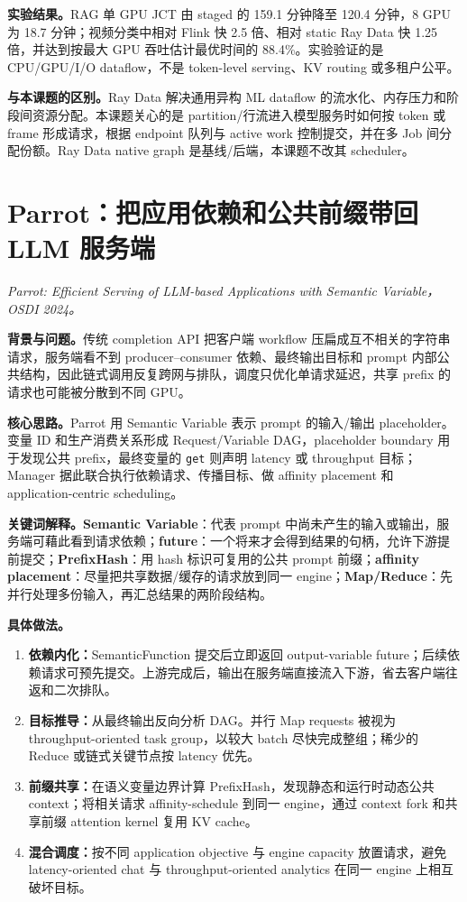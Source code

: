 \documentclass[10pt,a4paper]{ctexart}
\let\digestoriginalsection\section
\renewcommand{\section}{\Needspace{7\baselineskip}\digestoriginalsection}
\newcommand{\paperinfo}[1]{\textit{#1}\par}
\newcommand{\field}[1]{\par\noindent\textbf{#1。}\hspace{0.25em}}
\begin{document}
\field{实验结果}RAG 单 GPU JCT 由 staged 的 159.1 分钟降至 120.4 分钟，8 GPU 为 18.7 分钟；视频分类中相对 Flink 快 2.5 倍、相对 static Ray Data 快 1.25 倍，并达到按最大 GPU 吞吐估计最优时间的 88.4\%。实验验证的是 CPU/GPU/I/O dataflow，不是 token-level serving、KV routing 或多租户公平。

\field{与本课题的区别}Ray Data 解决通用异构 ML dataflow 的流水化、内存压力和阶段间资源分配。本课题关心的是 partition/行流进入模型服务时如何按 token 或 frame 形成请求，根据 endpoint 队列与 active work 控制提交，并在多 Job 间分配份额。Ray Data native graph 是基线/后端，本课题不改其 scheduler。

\section{Parrot：把应用依赖和公共前缀带回 LLM 服务端}
\paperinfo{Parrot: Efficient Serving of LLM-based Applications with Semantic Variable，OSDI 2024。}

\field{背景与问题}传统 completion API 把客户端 workflow 压扁成互不相关的字符串请求，服务端看不到 producer--consumer 依赖、最终输出目标和 prompt 内部公共结构，因此链式调用反复跨网与排队，调度只优化单请求延迟，共享 prefix 的请求也可能被分散到不同 GPU。

\field{核心思路}Parrot 用 Semantic Variable 表示 prompt 的输入/输出 placeholder。变量 ID 和生产消费关系形成 Request/Variable DAG，placeholder boundary 用于发现公共 prefix，最终变量的 \texttt{get} 则声明 latency 或 throughput 目标；Manager 据此联合执行依赖请求、传播目标、做 affinity placement 和 application-centric scheduling。

\field{关键词解释}\textbf{Semantic Variable}：代表 prompt 中尚未产生的输入或输出，服务端可藉此看到请求依赖；\textbf{future}：一个将来才会得到结果的句柄，允许下游提前提交；\textbf{PrefixHash}：用 hash 标识可复用的公共 prompt 前缀；\textbf{affinity placement}：尽量把共享数据/缓存的请求放到同一 engine；\textbf{Map/Reduce}：先并行处理多份输入，再汇总结果的两阶段结构。

\field{具体做法}
\begin{enumerate}
  \item \textbf{依赖内化：}SemanticFunction 提交后立即返回 output-variable future；后续依赖请求可预先提交。上游完成后，输出在服务端直接流入下游，省去客户端往返和二次排队。
  \item \textbf{目标推导：}从最终输出反向分析 DAG。并行 Map requests 被视为 throughput-oriented task group，以较大 batch 尽快完成整组；稀少的 Reduce 或链式关键节点按 latency 优先。
  \item \textbf{前缀共享：}在语义变量边界计算 PrefixHash，发现静态和运行时动态公共 context；将相关请求 affinity-schedule 到同一 engine，通过 context fork 和共享前缀 attention kernel 复用 KV cache。
  \item \textbf{混合调度：}按不同 application objective 与 engine capacity 放置请求，避免 latency-oriented chat 与 throughput-oriented analytics 在同一 engine 上相互破坏目标。
\end{enumerate}
\end{document}

